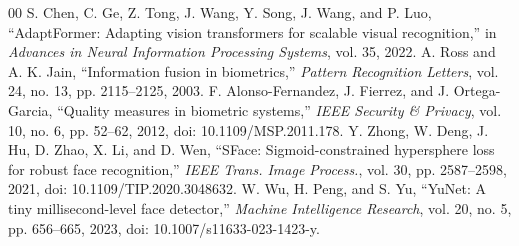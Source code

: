 \documentclass[12pt,a4paper,oneside]{report}
\begin{document}
\begin{thebibliography}{00}
 S. Chen, C. Ge, Z. Tong, J. Wang, Y. Song, J. Wang, and P. Luo, ``AdaptFormer: Adapting vision transformers for scalable visual recognition,'' in \textit{Advances in Neural Information Processing Systems}, vol. 35, 2022.
 A. Ross and A. K. Jain, ``Information fusion in biometrics,'' \textit{Pattern Recognition Letters}, vol. 24, no. 13, pp. 2115--2125, 2003.
 F. Alonso-Fernandez, J. Fierrez, and J. Ortega-Garcia, ``Quality measures in biometric systems,'' \textit{IEEE Security \& Privacy}, vol. 10, no. 6, pp. 52--62, 2012, doi: 10.1109/MSP.2011.178.
 Y. Zhong, W. Deng, J. Hu, D. Zhao, X. Li, and D. Wen, ``SFace: Sigmoid-constrained hypersphere loss for robust face recognition,'' \textit{IEEE Trans. Image Process.}, vol. 30, pp. 2587--2598, 2021, doi: 10.1109/TIP.2020.3048632.
 W. Wu, H. Peng, and S. Yu, ``YuNet: A tiny millisecond-level face detector,'' \textit{Machine Intelligence Research}, vol. 20, no. 5, pp. 656--665, 2023, doi: 10.1007/s11633-023-1423-y.
\end{thebibliography}
\end{document}
